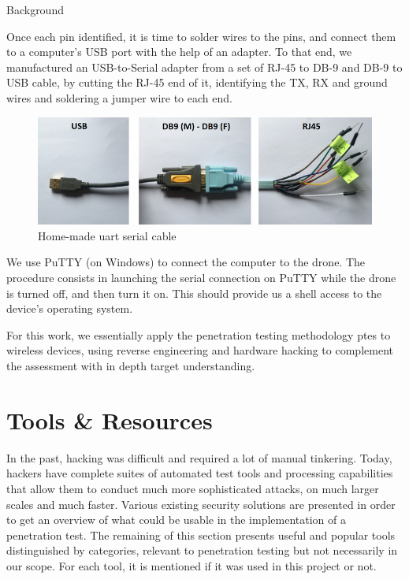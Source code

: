 \begin{chaptercover}{Background}
\begin{indentbox}{1cm}
Once each pin identified, it is time to solder wires to the pins, and connect them to a computer's USB port with the help of an adapter. To that end, we manufactured an USB-to-Serial adapter from a set of RJ-45 to DB-9 and DB-9 to USB cable, by cutting the RJ-45 end of it, identifying the TX, RX and ground wires and soldering a jumper wire to each end.

\begin{figure}[H]
  \centering
  \includegraphics[width=.7\linewidth]{figures/hw-hacking-wire}
  \caption{Home-made \acrshort{uart} serial cable}
  \label{fig:hw-hacking-wire}
\end{figure}

We use PuTTY \cite{putty} (on Windows) to connect the computer to the drone. The procedure consists in launching the serial connection on PuTTY while the drone is turned off, and then turn it on. This should provide us a shell access to the device's operating system.
\end{indentbox}

\begin{tip}
For this work, we essentially apply the penetration testing methodology \acrshort{ptes} to wireless devices, using reverse engineering and hardware hacking to complement the assessment with in depth target understanding.
\end{tip}


\section{Tools \& Resources}\label{subsec:tools-and-resources}

In the past, hacking was difficult and required a lot of manual tinkering. Today, hackers have complete suites of automated test tools and processing capabilities that allow them to conduct much more sophisticated attacks, on much larger scales and much faster. Various existing security solutions are presented in order to get an overview of what could be usable in the implementation of a penetration test. The remaining of this section presents useful and popular tools distinguished by categories, relevant to penetration testing but not necessarily in our scope. For each tool, it is mentioned if it was used in this project or not.


\end{chaptercover}
